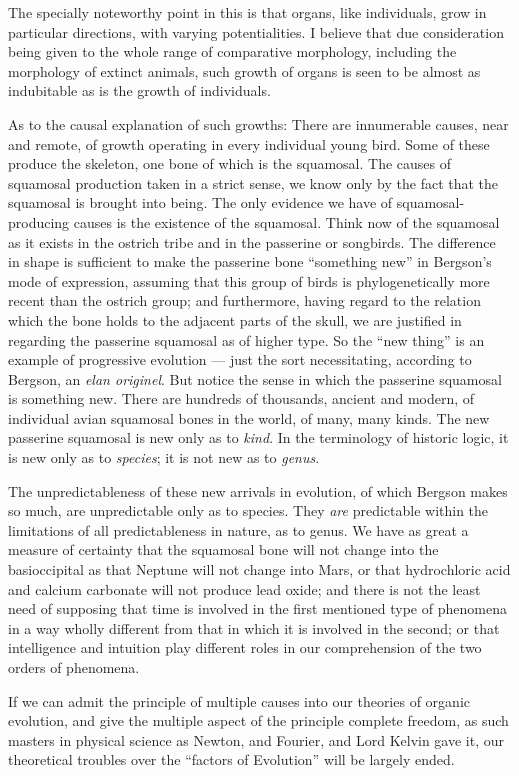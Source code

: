 \documentclass[a4paper, 11pt, oneside, polutonikogreek, english, landscape]{article}
\begin{document}
The specially noteworthy point in this is that organs, like individuals, grow in particular directions, with varying potentialities. I believe that due consideration being given to the whole range of comparative morphology, including the morphology of extinct animals, such growth of organs is seen to be almost as indubitable as is the growth of individuals.

As to the causal explanation of such growths: There are innumerable causes, near and remote, of growth operating in every individual young bird. Some of these produce the skeleton, one bone of which is the squamosal. The causes of squamosal production taken in a strict sense, we know only by the fact that the squamosal is brought into being. The only evidence we have of squamosal-producing causes is the existence of the squamosal. Think now of the squamosal as it exists in the ostrich tribe and in the passerine or songbirds. The difference in shape is sufficient to make the passerine bone ``something new'' in Bergson's mode of expression, assuming that this group of birds is phylogenetically more recent than the ostrich group; and furthermore, having regard to the relation which the bone holds to the adjacent parts of the skull, we are justified in regarding the passerine squamosal as of higher type. So the ``new thing'' is an example of progressive evolution --- just the sort necessitating, according to Bergson, an \emph{elan originel}. But notice the sense in which the passerine squamosal is something new. There are hundreds of thousands, ancient and modern, of individual avian squamosal bones in the world, of many, many kinds. The new passerine squamosal is new only as to \emph{kind}. In the terminology of historic logic, it is new only as to \emph{species}; it is not new as to \emph{genus}.

The unpredictableness of these new arrivals in evolution, of which Bergson makes so much, are unpredictable only as to species. They \emph{are} predictable within the limitations of all predictableness in nature, as to genus. We have as great a measure of certainty that the squamosal bone will not change into the basioccipital as that Neptune will not change into Mars, or that hydrochloric acid and calcium carbonate will not produce lead oxide; and there is not the least need of supposing that time is involved in the first mentioned type of phenomena in a way wholly different from that in which it is involved in the second; or that intelligence and intuition play different roles in our comprehension of the two orders of phenomena.

If we can admit the principle of multiple causes into our theories of organic evolution, and give the multiple aspect of the principle complete freedom, as such masters in physical science as Newton, and Fourier, and Lord Kelvin gave it, our theoretical troubles over the ``factors of Evolution'' will be largely ended.
\end{document}
